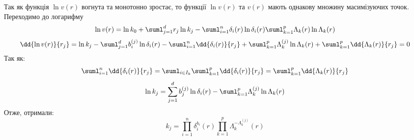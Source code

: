 Так як функція $\ln v(r)$ вогнута та монотонно зростає, то функції $\ln v(r)$ та $v(r)$ мають однакову множину масимізуючих точок. Переходимо до логарифму
\begin{equation}\label{tr:9:16}
\ln v(r) = \ln k_0 + \suml_{j=1}^d r_j \ln k_j  - \suml_{i=1}^n \delta_i(r)\ln\delta_i(r)  \suml_{k=1}^p \Lambda_k (r) \ln \Lambda_k(r)
\end{equation}
\begin{equation}
\dd{\ln v(r)}{r_j} = \ln k_j - \suml_{j=1}^d b_i^{(j)} \ln \delta_i(r) - \suml_{i=1}^n \dd{\delta_i(r)}{r_j} + \suml_{k=1}^p \Lambda_k^{(j)}\ln \Lambda_k(r) + \suml_{k=1}^p \dd{\Lambda_k(r)}{r_j} = 0
\end{equation}
Так як:
\begin{equation}
\suml_{i=1}^n \dd{\delta_i(r)}{r_j} = \suml_{i\in I_k} \suml_{k=1}^p \dd{\delta_i(r)}{r_j} = \suml_{k=1}^p \dd{\Lambda_k(r)}{r_j}
\end{equation}
\begin{equation}
\ln k_j = \sum_{j=1}^d  b_j^{(j)} \ln \delta_i(r)- \suml_{k=1}^p \Lambda_k^{(j)} \ln \Lambda_k(r)
\end{equation}
Отже, отримали:
\begin{equation}
k_j = \prod\limits_{i=1}^n \delta_i^{b_i} (r) \prod\limits_{k=1}^p \Lambda_k^{-\Lambda_k^{(j)}}(r)
\end{equation}